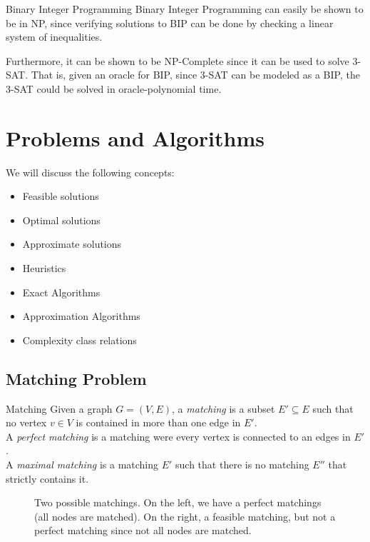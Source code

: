 \begin{general}{Binary Integer Programming}{\npcomplete}
Binary Integer Programming can easily be shown to be in NP, since verifying solutions to BIP can be done by checking a linear system of inequalities.  

Furthermore, it can be shown to be NP-Complete since it can be used to solve 3-SAT.  That is, given an oracle for BIP, since 3-SAT can be modeled as a BIP,  the 3-SAT could be solved in oracle-polynomial time.
\end{general}

\section{Problems and Algorithms}
We will discuss the following concepts:
\begin{itemize}
\item Feasible solutions
\item Optimal solutions
\item Approximate solutions
\item Heuristics
\item Exact Algorithms
\item Approximation Algorithms
\item Complexity class relations
\end{itemize}


\subsection{Matching Problem}




\begin{definition}{Matching}{}
Given a graph $G = (V,E)$, a \emph{matching} is a subset $E' \subseteq E$ such that no vertex $v \in V$ is contained in more than one edge in $E'$.  \\
A \emph{perfect matching} is a matching were every vertex is connected to an edges in $E'$.\\
A \emph{maximal matching} is a matching $E'$ such that there is no matching $E''$ that strictly contains it.
\end{definition}


\begin{figure}[H]
\label{fig:matching}
\caption{Two possible matchings.  On the left, we have a perfect matchings (all nodes are matched).  On the right, a feasible matching, but not a perfect matching since not all nodes are matched.}

\end{figure}







